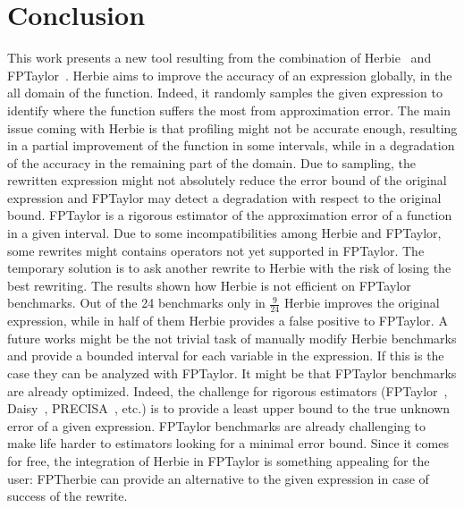 \documentclass[runningheads]{llncs}
\begin{document}
\section{Conclusion}
This work presents a new tool resulting from the combination of Herbie~\cite{herbie} and FPTaylor~\cite{fptaylor}. 
Herbie aims to improve the accuracy of an expression globally, in the all domain of the function. Indeed, it randomly samples the given expression to identify where the function suffers the most from approximation error. The main issue coming with Herbie is that profiling might not be accurate enough, resulting in a partial improvement of the function in some  intervals, while in a degradation of the accuracy in the remaining part of the domain. Due to sampling, the rewritten expression might not absolutely reduce the error bound of the original expression and FPTaylor may detect a degradation with respect to the original bound. FPTaylor is a rigorous estimator of the approximation error of a function in a given interval. Due to some incompatibilities among Herbie and FPTaylor, some rewrites might contains operators not yet supported in FPTaylor. The temporary solution is to ask another rewrite to Herbie with the risk of losing the best rewriting.
The results shown how Herbie is not efficient on FPTaylor benchmarks. Out of the 24 benchmarks only in $\frac{9}{24}$ Herbie improves the original expression, while in half of them Herbie provides a false positive to FPTaylor.
A future works might be the not trivial task of manually modify Herbie benchmarks and provide a bounded interval for each variable in the expression. If this is the case they can be analyzed with FPTaylor. 
It might be that FPTaylor benchmarks are already optimized. Indeed, the challenge for rigorous estimators (FPTaylor~\cite{fptaylor}, Daisy~\cite{daisy}, PRECISA~\cite{precisa}, etc.) is to provide a least upper bound to the true unknown error of a given expression. FPTaylor benchmarks are already challenging to make life harder to estimators looking for a minimal error bound. Since it comes for free, the integration of Herbie in FPTaylor is something appealing for the user: FPTherbie can provide an alternative to the given expression in case of success of the rewrite. 

%
%


\end{document}
